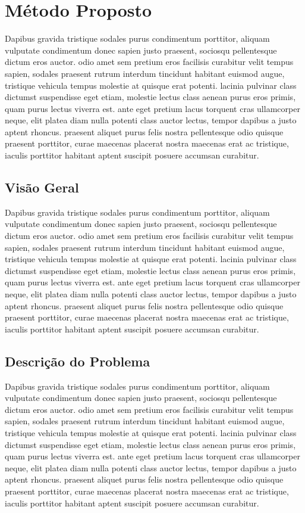 \chapter{Método Proposto}      \label{Metodo Proposto}

Dapibus gravida tristique sodales purus condimentum porttitor, aliquam vulputate condimentum donec sapien justo praesent, sociosqu pellentesque dictum eros auctor. odio amet sem pretium eros facilisis curabitur velit tempus sapien, sodales praesent rutrum interdum tincidunt habitant euismod augue, tristique vehicula tempus molestie at quisque erat potenti. lacinia pulvinar class dictumst suspendisse eget etiam, molestie lectus class aenean purus eros primis, quam purus lectus viverra est. ante eget pretium lacus torquent cras ullamcorper neque, elit platea diam nulla potenti class auctor lectus, tempor dapibus a justo aptent rhoncus. praesent aliquet purus felis nostra pellentesque odio quisque praesent porttitor, curae maecenas placerat nostra maecenas erat ac tristique, iaculis porttitor habitant aptent suscipit posuere accumsan curabitur.


\section{Visão Geral}

Dapibus gravida tristique sodales purus condimentum porttitor, aliquam vulputate condimentum donec sapien justo praesent, sociosqu pellentesque dictum eros auctor. odio amet sem pretium eros facilisis curabitur velit tempus sapien, sodales praesent rutrum interdum tincidunt habitant euismod augue, tristique vehicula tempus molestie at quisque erat potenti. lacinia pulvinar class dictumst suspendisse eget etiam, molestie lectus class aenean purus eros primis, quam purus lectus viverra est. ante eget pretium lacus torquent cras ullamcorper neque, elit platea diam nulla potenti class auctor lectus, tempor dapibus a justo aptent rhoncus. praesent aliquet purus felis nostra pellentesque odio quisque praesent porttitor, curae maecenas placerat nostra maecenas erat ac tristique, iaculis porttitor habitant aptent suscipit posuere accumsan curabitur.


\section{Descrição do Problema}

Dapibus gravida tristique sodales purus condimentum porttitor, aliquam vulputate condimentum donec sapien justo praesent, sociosqu pellentesque dictum eros auctor. odio amet sem pretium eros facilisis curabitur velit tempus sapien, sodales praesent rutrum interdum tincidunt habitant euismod augue, tristique vehicula tempus molestie at quisque erat potenti. lacinia pulvinar class dictumst suspendisse eget etiam, molestie lectus class aenean purus eros primis, quam purus lectus viverra est. ante eget pretium lacus torquent cras ullamcorper neque, elit platea diam nulla potenti class auctor lectus, tempor dapibus a justo aptent rhoncus. praesent aliquet purus felis nostra pellentesque odio quisque praesent porttitor, curae maecenas placerat nostra maecenas erat ac tristique, iaculis porttitor habitant aptent suscipit posuere accumsan curabitur.

